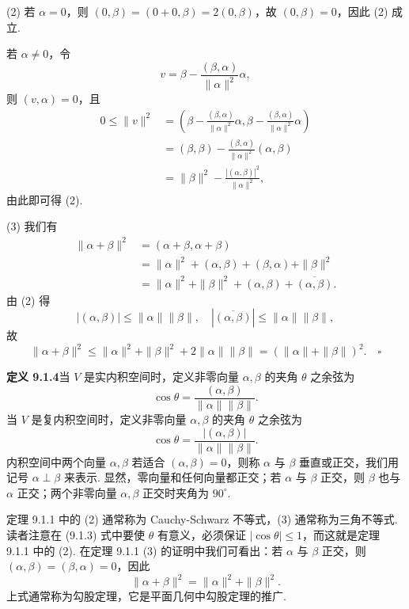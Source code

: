 \documentclass[UTF8, 12pt, fontset=fandol, oneside]{ctexart}
\begin{document}
(2) 若 $\alpha=0$，则 $(0,\beta)=(0+0,\beta)=2(0,\beta)$，故 $(0,\beta)=0$，因此 (2) 成立.

若 $\alpha\ne0$，令
\[
  v=\beta-\frac{(\beta,\alpha)}{\|\alpha\|^2}\alpha,
\]
则 $(v,\alpha)=0$，且
\[
\begin{aligned}
  0\le \|v\|^2
  &=
  \left(\beta-\frac{(\beta,\alpha)}{\|\alpha\|^2}\alpha,
  \beta-\frac{(\beta,\alpha)}{\|\alpha\|^2}\alpha\right)\\
  &=(\beta,\beta)-\frac{(\beta,\alpha)}{\|\alpha\|^2}(\alpha,\beta)\\
  &=\|\beta\|^2-\frac{|(\alpha,\beta)|^2}{\|\alpha\|^2},
\end{aligned}
\]
由此即可得 (2).

(3) 我们有
\[
\begin{aligned}
  \|\alpha+\beta\|^2
  &=(\alpha+\beta,\alpha+\beta)\\
  &=\|\alpha\|^2+(\alpha,\beta)+(\beta,\alpha)+\|\beta\|^2\\
  &=\|\alpha\|^2+\|\beta\|^2+(\alpha,\beta)+\overline{(\alpha,\beta)}.
\end{aligned}
\]
由 (2) 得
\[
  |(\alpha,\beta)|\le \|\alpha\|\|\beta\|,
  \quad
  |\overline{(\alpha,\beta)}|\le \|\alpha\|\|\beta\|,
\]
故
\[
  \|\alpha+\beta\|^2\le \|\alpha\|^2+\|\beta\|^2+2\|\alpha\|\|\beta\|=(\|\alpha\|+\|\beta\|)^2. \quad \square
\]

\noindent\textbf{定义 9.1.4}\quad 当 $V$ 是实内积空间时，定义非零向量 $\alpha,\beta$ 的夹角 $\theta$ 之余弦为
\begin{equation}
  \cos\theta=\frac{(\alpha,\beta)}{\|\alpha\|\|\beta\|}.
  \tag{9.1.3}
\end{equation}
当 $V$ 是复内积空间时，定义非零向量 $\alpha,\beta$ 的夹角 $\theta$ 之余弦为
\[
  \cos\theta=\frac{|(\alpha,\beta)|}{\|\alpha\|\|\beta\|}.
\]
内积空间中两个向量 $\alpha,\beta$ 若适合 $(\alpha,\beta)=0$，则称 $\alpha$ 与 $\beta$ 垂直或正交，我们用记号 $\alpha\perp\beta$ 来表示. 显然，零向量和任何向量都正交；若 $\alpha$ 与 $\beta$ 正交，则 $\beta$ 也与 $\alpha$ 正交；两个非零向量 $\alpha,\beta$ 正交时夹角为 $90^\circ$.

定理 9.1.1 中的 (2) 通常称为 Cauchy-Schwarz 不等式，(3) 通常称为三角不等式. 读者注意在 (9.1.3) 式中要使 $\theta$ 有意义，必须保证 $|\cos\theta|\le1$，而这就是定理 9.1.1 中的 (2). 在定理 9.1.1 (3) 的证明中我们可看出：若 $\alpha$ 与 $\beta$ 正交，则 $(\alpha,\beta)=(\beta,\alpha)=0$，因此
\begin{equation}
  \|\alpha+\beta\|^2=\|\alpha\|^2+\|\beta\|^2.
  \tag{9.1.4}
\end{equation}
上式通常称为勾股定理，它是平面几何中勾股定理的推广.
\end{document}
